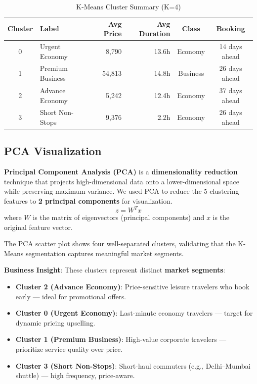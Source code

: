 \documentclass[12pt, a4paper]{article}
\newcommand{\rupee}{\text{₹}}
\begin{document}
\begin{table}[H]
\centering
\caption{K-Means Cluster Summary (K=4)}
\begin{tabular}{c l r r c c}
\toprule
\textbf{Cluster} & \textbf{Label} & \textbf{Avg Price} & \textbf{Avg Duration} & \textbf{Class} & \textbf{Booking} \\
\midrule
0 & Urgent Economy    & \rupee8,790  & 13.6h & Economy  & 14 days ahead \\
1 & Premium Business  & \rupee54,813 & 14.8h & Business & 26 days ahead \\
2 & Advance Economy   & \rupee5,242  & 12.4h & Economy  & 37 days ahead \\
3 & Short Non-Stops   & \rupee9,376  & 2.2h  & Economy  & 26 days ahead \\
\bottomrule
\end{tabular}
\end{table}

\subsection{PCA Visualization}

\begin{keyterm}
\textbf{Principal Component Analysis (PCA)} is a \textbf{dimensionality reduction} technique that projects high-dimensional data onto a lower-dimensional space while preserving maximum variance. We used PCA to reduce the 5 clustering features to \textbf{2 principal components} for visualization.
\[
    z = W^T x
\]
where $W$ is the matrix of eigenvectors (principal components) and $x$ is the original feature vector.
\end{keyterm}

The PCA scatter plot shows four well-separated clusters, validating that the K-Means segmentation captures meaningful market segments.

\begin{insightbox}
\textbf{Business Insight}: These clusters represent distinct \textbf{market segments}:
\begin{itemize}
    \item \textbf{Cluster 2 (Advance Economy)}: Price-sensitive leisure travelers who book early — ideal for promotional offers.
    \item \textbf{Cluster 0 (Urgent Economy)}: Last-minute economy travelers — target for dynamic pricing upselling.
    \item \textbf{Cluster 1 (Premium Business)}: High-value corporate travelers — prioritize service quality over price.
    \item \textbf{Cluster 3 (Short Non-Stops)}: Short-haul commuters (e.g., Delhi--Mumbai shuttle) — high frequency, price-aware.
\end{itemize}
\end{insightbox}
\end{document}

